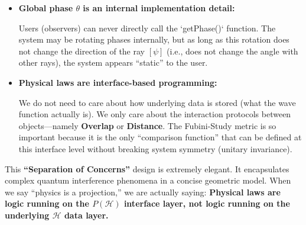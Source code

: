 \begin{itemize}
\item \textbf{Global phase $\theta$ is an internal implementation detail:}

    Users (observers) can never directly call the `getPhase()` function. The system may be rotating phases internally, but as long as this rotation does not change the direction of the ray $[\psi]$ (i.e., does not change the angle with other rays), the system appears ``static'' to the user.

\item \textbf{Physical laws are interface-based programming:}

    We do not need to care about how underlying data is stored (what the wave function actually is). We only care about the interaction protocols between objects---namely \textbf{Overlap} or \textbf{Distance}. The Fubini-Study metric is so important because it is the only ``comparison function'' that can be defined at this interface level without breaking system symmetry (unitary invariance).
\end{itemize}

This \textbf{``Separation of Concerns''} design is extremely elegant. It encapsulates complex quantum interference phenomena in a concise geometric model. When we say ``physics is a projection,'' we are actually saying: \textbf{Physical laws are logic running on the $P(\mathcal{H})$ interface layer, not logic running on the underlying $\mathcal{H}$ data layer.}

